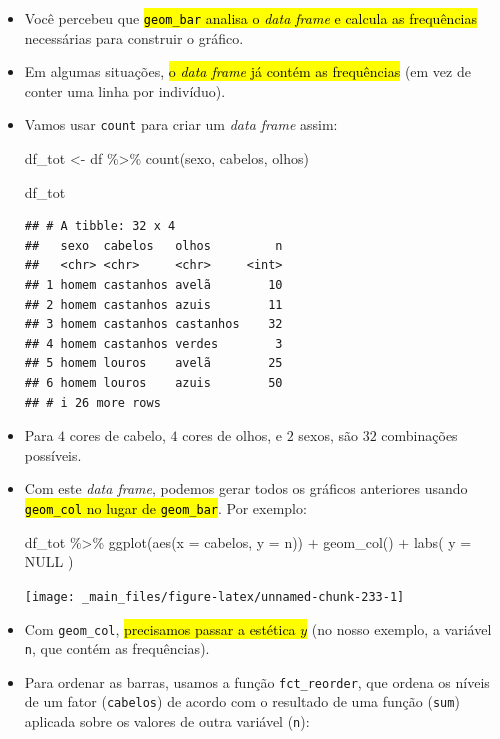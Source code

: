 \documentclass[
  11pt]{report}
\newenvironment{Shaded}{\begin{snugshade}}{\end{snugshade}}
\newcommand{\AttributeTok}[1]{\textcolor[rgb]{0.77,0.63,0.00}{#1}}
\newcommand{\ConstantTok}[1]{\textcolor[rgb]{0.00,0.00,0.00}{#1}}
\newcommand{\FunctionTok}[1]{\textcolor[rgb]{0.00,0.00,0.00}{#1}}
\newcommand{\NormalTok}[1]{#1}
\newcommand{\OtherTok}[1]{\textcolor[rgb]{0.56,0.35,0.01}{#1}}
\newcommand{\SpecialCharTok}[1]{\textcolor[rgb]{0.00,0.00,0.00}{#1}}
\renewenvironment{Shaded}{
    \begin{mdframed}[%
      roundcorner=2pt,%
      innerleftmargin=5pt,%
      innerrightmargin=5pt,%
      topline=true,%
      leftline=true,%
      rightline=true,%
      bottomline=true,%
      linewidth=0.5pt,%
      linecolor=black!20,%
      backgroundcolor=black!2,%
      skipabove=2ex,%
      skipbelow=2.5ex%
    ]%
  }
  {
    \end{mdframed}
  }
\begin{document}
\begin{itemize}
\item
  Você percebeu que {\hl{{\mbox{\texttt{geom\_bar}}} analisa o \emph{data frame} e calcula as frequências}} necessárias para construir o gráfico.
\item
  Em algumas situações, {\hl{o \emph{data frame} já contém as frequências}} (em vez de conter uma linha por indivíduo).
\item
  Vamos usar \texttt{count} para criar um \emph{data frame} assim:

\begin{Shaded}
\begin{Highlighting}[]
\NormalTok{df\_tot }\OtherTok{\textless{}{-}}\NormalTok{ df }\SpecialCharTok{\%\textgreater{}\%} 
  \FunctionTok{count}\NormalTok{(sexo, cabelos, olhos)}

\NormalTok{df\_tot}
\end{Highlighting}
\end{Shaded}

\begin{verbatim}
## # A tibble: 32 x 4
##   sexo  cabelos   olhos         n
##   <chr> <chr>     <chr>     <int>
## 1 homem castanhos avelã        10
## 2 homem castanhos azuis        11
## 3 homem castanhos castanhos    32
## 4 homem castanhos verdes        3
## 5 homem louros    avelã        25
## 6 homem louros    azuis        50
## # i 26 more rows
\end{verbatim}
\item
  Para $4$ cores de cabelo, $4$ cores de olhos, e $2$ sexos, são $32$ combinações possíveis.
\item
  Com este \emph{data frame}, podemos gerar todos os gráficos anteriores usando {\hl{{\mbox{\texttt{geom\_col}}} no lugar de {\mbox{\texttt{geom\_bar}}}}}. Por exemplo:

\begin{Shaded}
\begin{Highlighting}[]
\NormalTok{df\_tot }\SpecialCharTok{\%\textgreater{}\%} 
  \FunctionTok{ggplot}\NormalTok{(}\FunctionTok{aes}\NormalTok{(}\AttributeTok{x =}\NormalTok{ cabelos, }\AttributeTok{y =}\NormalTok{ n)) }\SpecialCharTok{+}
    \FunctionTok{geom\_col}\NormalTok{() }\SpecialCharTok{+}
    \FunctionTok{labs}\NormalTok{(}
      \AttributeTok{y =} \ConstantTok{NULL}
\NormalTok{    )}
\end{Highlighting}
\end{Shaded}

  \begin{center}\texttt{[image: \_main\_files/figure-latex/unnamed-chunk-233-1]} \end{center}
\item
  Com \texttt{geom\_col}, {\hl{precisamos passar a estética $y$}} (no nosso exemplo, a variável \texttt{n}, que contém as frequências).
\item
  Para ordenar as barras, usamos a função \texttt{fct\_reorder}, que ordena os níveis de um fator (\texttt{cabelos}) de acordo com o resultado de uma função (\texttt{sum}) aplicada sobre os valores de outra variável (\texttt{n}):


\end{itemize}
\end{document}
